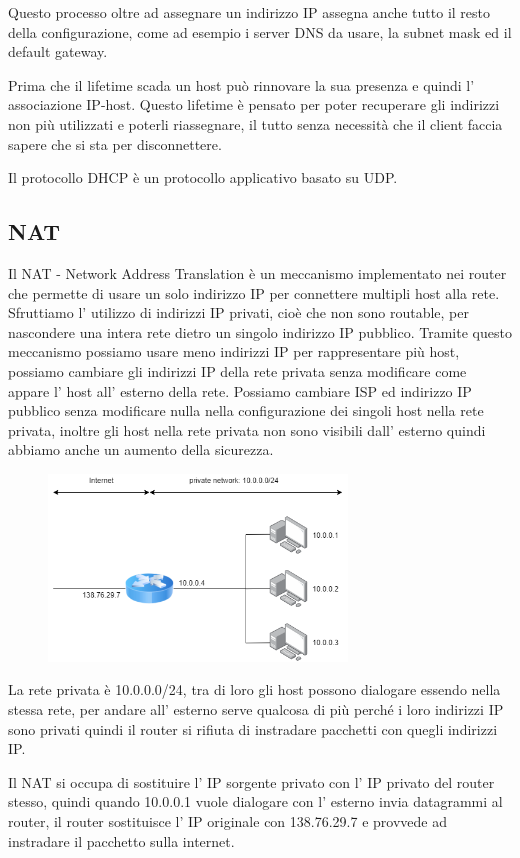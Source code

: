 Questo processo oltre ad assegnare un indirizzo IP assegna anche tutto il resto della configurazione, come ad esempio i server DNS da usare, la subnet mask ed il default gateway.

Prima che il lifetime scada un host può rinnovare la sua presenza e quindi l' associazione IP-host.
Questo lifetime è pensato per poter recuperare gli indirizzi non più utilizzati e poterli riassegnare, il tutto senza necessità che il client faccia sapere che si sta per disconnettere.

Il protocollo DHCP è un protocollo applicativo basato su UDP.

\subsection{NAT}
Il NAT - Network Address Translation è un meccanismo implementato nei router che permette di usare un solo indirizzo IP per connettere multipli host alla rete.
Sfruttiamo l' utilizzo di indirizzi IP privati, cioè che non sono routable, per nascondere una intera rete dietro un singolo indirizzo IP pubblico.
Tramite questo meccanismo possiamo usare meno indirizzi IP per rappresentare più host, possiamo cambiare gli indirizzi IP della rete privata senza modificare come appare l' host all' esterno della rete.
Possiamo cambiare ISP ed indirizzo IP pubblico senza modificare nulla nella configurazione dei singoli host nella rete privata, inoltre gli host nella rete privata non sono visibili dall' esterno quindi abbiamo anche un aumento della sicurezza.
\begin{figure}[H]
    \centering
    \includegraphics[width=300px]{images/5_Internetworking/NAT.png}
\end{figure}
La rete privata è 10.0.0.0/24, tra di loro gli host possono dialogare essendo nella stessa rete, per andare all' esterno serve qualcosa di più perché i loro indirizzi IP sono privati quindi il router si rifiuta di instradare pacchetti con quegli indirizzi IP.

Il NAT si occupa di sostituire l' IP sorgente privato con l' IP privato del router stesso, quindi quando 10.0.0.1 vuole dialogare con l' esterno invia datagrammi al router, il router sostituisce l' IP originale con 138.76.29.7 e provvede ad instradare il pacchetto sulla internet.

